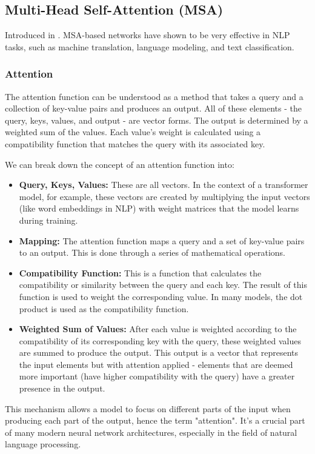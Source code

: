\subsection{Multi-Head Self-Attention (MSA)}
Introduced in \cite{vaswani2017}. MSA-based networks have shown to be very effective in NLP tasks, such as machine translation, language modeling, and text classification.

\subsubsection{Attention}
The attention function can be understood as a method that takes a query and a collection of key-value pairs and produces an output. All of these elements - the query, keys, values, and output - are vector forms. The output is determined by a weighted sum of the values. Each value's weight is calculated using a compatibility function that matches the query with its associated key.

We can break down the concept of an attention function into:
\begin{itemize}
    \item \textbf{Query, Keys, Values:} These are all vectors. In the context of a transformer model, for example, these vectors are created by multiplying the input vectors (like word embeddings in NLP) with weight matrices that the model learns during training.
    \item \textbf{Mapping:} The attention function maps a query and a set of key-value pairs to an output. This is done through a series of mathematical operations.
    \item \textbf{Compatibility Function:} This is a function that calculates the compatibility or similarity between the query and each key. The result of this function is used to weight the corresponding value. In many models, the dot product is used as the compatibility function.
    \item \textbf{Weighted Sum of Values:} After each value is weighted according to the compatibility of its corresponding key with the query, these weighted values are summed to produce the output. This output is a vector that represents the input elements but with attention applied - elements that are deemed more important (have higher compatibility with the query) have a greater presence in the output.
\end{itemize}

This mechanism allows a model to focus on different parts of the input when producing each part of the output, hence the term "attention". It's a crucial part of many modern neural network architectures, especially in the field of natural language processing.

